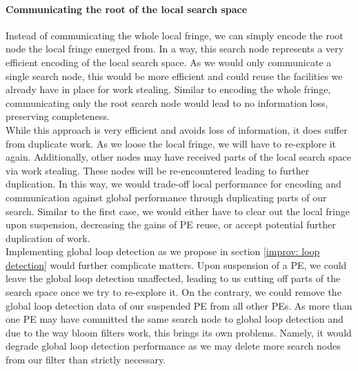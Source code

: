 \paragraph{Communicating the root of the local search space}
Instead of communicating the whole local fringe, we can simply encode the root node the local fringe emerged from. In a way, this search node represents a very efficient encoding of the local search space. As we would only communicate a single search node, this would be more efficient and could reuse the facilities we already have in place for work stealing. Similar to encoding the whole fringe, communicating only the root search node would lead to no information loss, preserving completeness. \\
While this approach is very efficient and avoids loss of information, it does suffer from duplicate work. As we loose the local fringe, we will have to re-explore it again. Additionally, other nodes may have received parts of the local search space via work stealing. These nodes will be re-encountered leading to further duplication. In this way, we would trade-off local performance for encoding and communication against global performance through duplicating parts of our search. Similar to the first case, we would either have to clear out the local fringe upon suspension, decreasing the gains of PE reuse, or accept potential further duplication of work.\\
Implementing global loop detection as we propose in section \ref{improv: loop detection} would further complicate matters. Upon suspension of a PE, we could leave the global loop detection unaffected, leading to us cutting off parts of the search space once we try to re-explore it. On the contrary, we could remove the global loop detection data of our suspended PE from all other PEs. As more than one PE may have committed the same search node to global loop detection and due to the way bloom filters work, this brings its own problems. Namely, it would degrade global loop detection performance as we may delete more search nodes from our filter than strictly necessary.
\begin{comment}
- easy and cheap
- duplication of work
- re-exploring things
- nodes that were sent off to other PEs
- how to deal with global loop detection
- delete everything, too conservative, less performance
- do not delete, cut off things wrongly
- restarts deal with this increased false positive rate
\end{comment}

